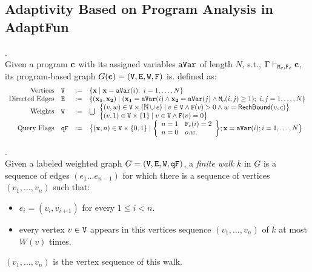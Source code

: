 \documentclass[a4paper,11pt]{article}
\newcommand{\THESYSTEM}{\textsf{AdaptFun}}
\begin{document}
\subsection{Adaptivity Based on Program Analysis in \THESYSTEM}
%
 \begin{defn}
.
\label{def:prog-based_graph}
\\
Given a program ${\boldsymbol{\mathbf{c}}}$ with its assigned variables $\mathtt{aVar}$ of length $N$, s.t.,
$\Gamma \vdash_{\mathtt{M}_c, \mathtt{F}_c} {\boldsymbol{\mathbf{c}}}$, 
its program-based graph 
$G({\boldsymbol{\mathbf{c}}}) = (\mathtt{V}, \mathtt{E}, \mathtt{W}, \mathtt{F})$ is. defined as:
\\
\[
\begin{array}{rlcl}
	\text{Vertices} &
	\vertxs & := & \left\{ 
	\ssa{x} \mid
	\ssa{x} = \avar(i); ~ i = 1, \ldots, N
	\right\}
	\\
	\text{Directed Edges} &
	\edges & := & 
	\left\{ 
	(\ssa{x_1}, \ssa{x_2}) 
	\mid
		(\ssa{x_1} = \avar(i) \land \ssa{x_2} = \avar(j) \land
		\Mtrix_c(i, j) \geq 1); ~ i,j = 1, \ldots, N
	\right\}
	\\
	\text{Weights} &
	\weights & := &
	\bigcup
	\begin{array}{l}
		\big\{ (v, w) \in \vertxs \times (\mathbb{N} \cup \expr)
		\mid
		v \in \vertxs \land \flag(v) > 0 \land w = \rb(v, c)
		\big\} 
		\\
		\big\{(v, 1)  \in \vertxs \times \{1\} 
		\mid
		v \in \vertxs \land \flag(v) = 0
		\big\}
	\end{array} 
	\\
	\text{Query Flags} &
	\qflag & := & 
	\big\{(\ssa{x}, n)  \in \vertxs \times \{0, 1\} 
	\mid 
	\left\{
	\begin{array} {ll}
	n = 1 & \flag_c(i) = 2
	\\  
	n = 0 & o.w.
	\end{array}
	\right\};
	\ssa{x} = \avar(i); i = 1, \ldots, N
	\big\}
\end{array}
\]
\end{defn} 
%
\begin{defn}.
\\
Given a labeled weighted graph $G = (\mathtt{V}, \mathtt{E}, \mathtt{W}, \mathtt{qF})$, a \emph{finite walk} $k$ in $G$ is a sequence of edges $(e_1 \ldots e_{n - 1})$ 
for which there is a sequence of vertices $(v_1, \ldots, v_{n})$ such that:
\begin{itemize}
    \item $e_i = (v_{i},v_{i + 1})$ for every $1 \leq i < n$.
    \item every vertex $v \in \mathtt{V}$ appears in this vertices sequence $(v_1, \ldots, v_{n})$ of $k$ at most $W(v)$ times.  
\end{itemize}
$(v_1, \ldots, v_{n})$ is the vertex sequence of this walk.
\\
\end{defn}
\end{document}
